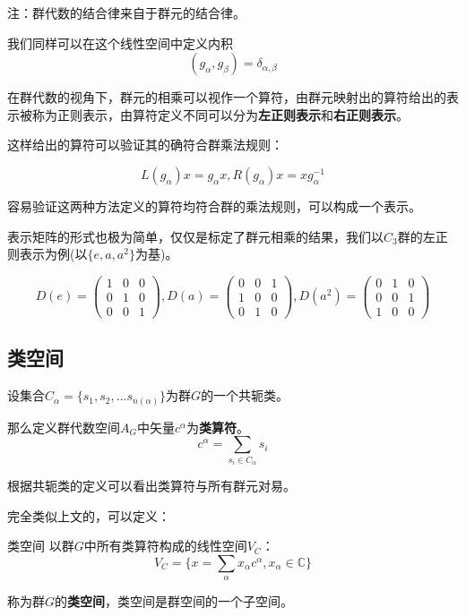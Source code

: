 注：群代数的结合律来自于群元的结合律。

我们同样可以在这个线性空间中定义内积
$$(g_\alpha,g_\beta)=\delta_{\alpha,\beta}$$

在群代数的视角下，群元的相乘可以视作一个算符，由群元映射出的算符给出的表示被称为正则表示，由算符定义不同可以分为\textbf{左正则表示}和\textbf{右正则表示}。

这样给出的算符可以验证其的确符合群乘法规则：

$$L(g_\alpha)x=g_\alpha x,R(g_\alpha)x=xg_\alpha^{-1}$$

容易验证这两种方法定义的算符均符合群的乘法规则，可以构成一个表示。

表示矩阵的形式也极为简单，仅仅是标定了群元相乘的结果，我们以$C_3$群的左正则表示为例(以$\{e,a,a^2\}$为基)。

$$D(e)=\begin{pmatrix}
 1& 0& 0\\
 0 &1 & 0 \\
 0&0&1
 \end{pmatrix},
 D(a)=\begin{pmatrix}
 0&0& 1\\
 1&0 & 0 \\
 0&1&0
 \end{pmatrix},
 D(a^2)=\begin{pmatrix}
 0& 1& 0\\
 0 &0 & 1 \\
 1&0&0
\end{pmatrix}$$

\subsection{类空间}

\begin{definition}{}
设集合$C_\alpha=\{s_1,s_2,...s_{n(\alpha)}\}$为群$G$的一个共轭类。

那么定义群代数空间$A_G$中矢量$c^\alpha$为\textbf{类算符}。
$$c^\alpha=\displaystyle\sum_{s_i\in C_\alpha}s_i$$
\end{definition}

根据共轭类的定义可以看出类算符与所有群元对易。

完全类似上文的，可以定义：
\begin{definition}{类空间}
以群$G$中所有类算符构成的线性空间$V_C$：
$$V_C=\{x=\displaystyle\sum_\alpha x_\alpha c^\alpha,x_\alpha \in \mathbb{C}\}$$

称为群$G$的\textbf{类空间}，类空间是群空间的一个子空间。
\end{definition}